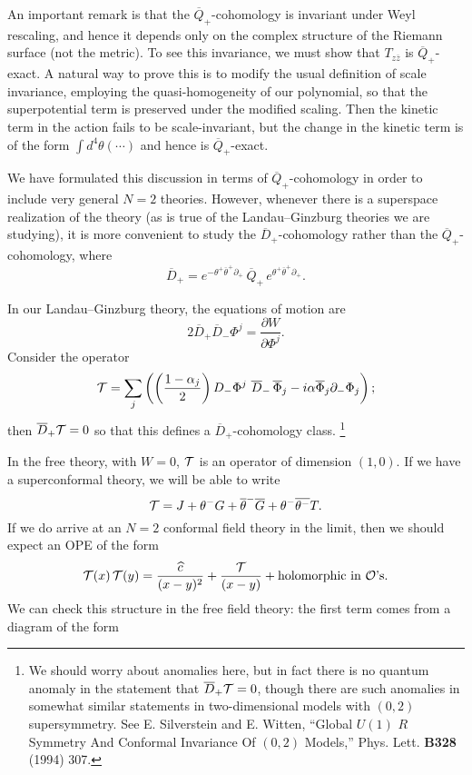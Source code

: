 An important remark is that the $\overline{Q}_+$-cohomology is invariant under
Weyl rescaling,
and hence it depends only on the complex structure of the Riemann surface (not
the metric).
To see this invariance, we must show that $T_{z\overline{z}}$ is
$\overline{Q}_+$-exact.
A natural way to prove this is to modify  the usual definition of scale
invariance, employing the
quasi-homogeneity of our polynomial, so that the superpotential term is
preserved under
the modified scaling.  Then the kinetic term in the action fails to be
scale-invariant,
but the change in the kinetic term is of the form $\int d^4\theta(\cdots)$ and
hence is
$\overline{Q}_+$-exact.

We have formulated this discussion in terms of $\overline{Q}_+$-cohomology in
order to include
very general $N{=}2$ theories.  However, whenever there is a superspace
realization of the theory
(as is true of the Landau--Ginzburg theories we are studying), it is more
convenient to
study the $\overline{D}_+$-cohomology rather than the
$\overline{Q}_+$-cohomology, where
$$\overline{D}_+=e^{-\theta^+ \overline{\theta}^+\partial_+}\,\overline{Q}_+\,
e^{\theta^+\overline{\theta}^+\partial_+}.$$

In our Landau--Ginzburg theory, the equations of motion are
$$2\overline{D}_+\overline{D}_-\Phi^j=\frac{\partial W}{\partial\Phi^j}.$$
Consider the operator
$${\cal T}=\sum_j\left(\left(\frac{1-\alpha_j}2\right)D_-\Phi^j\,\,\overline{D}
_- \,\overline{\Phi}_j
-i\alpha\overline{\Phi}_j\partial_-\Phi_j\right);$$
then $\overline{D}_+{\cal T}=0$ so that this defines a
$\overline{D}_+$-cohomology class.
\footnote{We should worry about anomalies here, but in fact there is no
quantum anomaly in the statement
that $\overline D_+{\cal T}=0$, though there are such anomalies in somewhat
similar statements
in two-dimensional models with $(0,2)$ supersymmetry.  See E. Silverstein and
E. Witten,
``Global $U(1)$ $R$ Symmetry And Conformal Invariance Of $(0,2)$ Models,''
Phys. Lett.
{\bf B328} (1994) 307.}

In the free theory, with $W=0$, ${\cal T}$ is an operator of dimension
$(1,0)$.  If we have
a superconformal theory, we will be able to write
$${\cal T}=J+\theta^-G+\overline{\theta}^-\overline{G}+\theta^-\overline{\theta
^-}T.$$
If we do arrive at an $N{=}2$ conformal field theory in the limit, then we
should expect
an OPE of the form
$${\cal T}(x)\,{\cal T}(y)=\frac{\widehat c}{(x-y)^2}
+\frac{\cal T}{(x-y)}+ \mbox{holomorphic in ${\cal O}$'s}.$$
We can check this structure in the free field theory:  the first term comes
from a diagram of
the form

